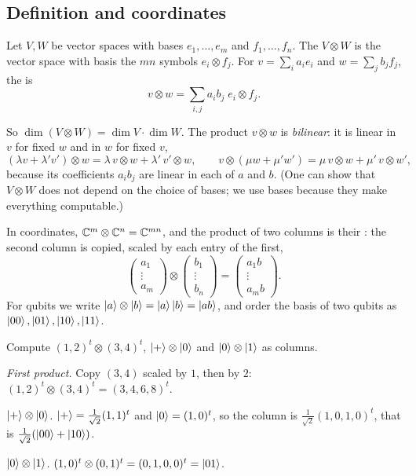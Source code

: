 \subsection{Definition and coordinates}

\begin{definition}\label{def:tensor}
  Let $V,W$ be vector spaces with bases $e_1,\dots,e_m$ and $f_1,\dots,f_n$. The  $V\otimes W$ is the vector space with basis the $mn$ symbols $e_i\otimes f_j$. For $v=\sum_ia_ie_i$ and $w=\sum_jb_jf_j$, the  is
  \[
    v\otimes w=\sum_{i,j}a_ib_j\;e_i\otimes f_j .
  \]
\end{definition}

So $\dim(V\otimes W)=\dim V\cdot\dim W$. The product $v\otimes w$ is \emph{bilinear}: it is linear in $v$ for fixed $w$ and in $w$ for fixed $v$,
\[
  (\lambda v+\lambda'v')\otimes w=\lambda\,v\otimes w+\lambda'\,v'\otimes w,\qquad v\otimes(\mu w+\mu'w')=\mu\,v\otimes w+\mu'\,v\otimes w',
\]
because its coefficients $a_ib_j$ are linear in each of $a$ and $b$. (One can show that $V\otimes W$ does not depend on the choice of bases; we use bases because they make everything computable.)

In coordinates, $\mathbb{C}^m\otimes\mathbb{C}^n=\mathbb{C}^{mn}$, and the product of two columns is their : the second column is copied, scaled by each entry of the first,
\[
  \begin{pmatrix}a_1\\\vdots\\a_m\end{pmatrix}\otimes\begin{pmatrix}b_1\\\vdots\\b_n\end{pmatrix}
  =\begin{pmatrix}a_1b\\\vdots\\a_mb\end{pmatrix}.
\]
For qubits we write $\left|a\right\rangle\otimes\left|b\right\rangle=\left|a\right\rangle\left|b\right\rangle=\left|ab\right\rangle$, and order the basis of two qubits as $\left|00\right\rangle,\left|01\right\rangle,\left|10\right\rangle,\left|11\right\rangle$.

\begin{example}[Coordinates]\label{ex:tensor-coords}
  Compute $(1,2)^t\otimes(3,4)^t$, $\left|+\right\rangle\otimes\left|0\right\rangle$ and $\left|0\right\rangle\otimes\left|1\right\rangle$ as columns.
\end{example}
\begin{solution}
  \begin{steps}
    \item \emph{First product.} Copy $(3,4)$ scaled by $1$, then by $2$: $(1,2)^t\otimes(3,4)^t=(3,4,6,8)^t$.
    \item \emph{$\left|+\right\rangle\otimes\left|0\right\rangle$.} $\left|+\right\rangle=\frac1{\sqrt2}(1,1)^t$ and $\left|0\right\rangle=(1,0)^t$, so the column is $\frac1{\sqrt2}(1,0,1,0)^t$, that is $\frac1{\sqrt2}(\left|00\right\rangle+\left|10\right\rangle)$.
    \item \emph{$\left|0\right\rangle\otimes\left|1\right\rangle$.} $(1,0)^t\otimes(0,1)^t=(0,1,0,0)^t=\left|01\right\rangle$.
  \end{steps}
\end{solution}

